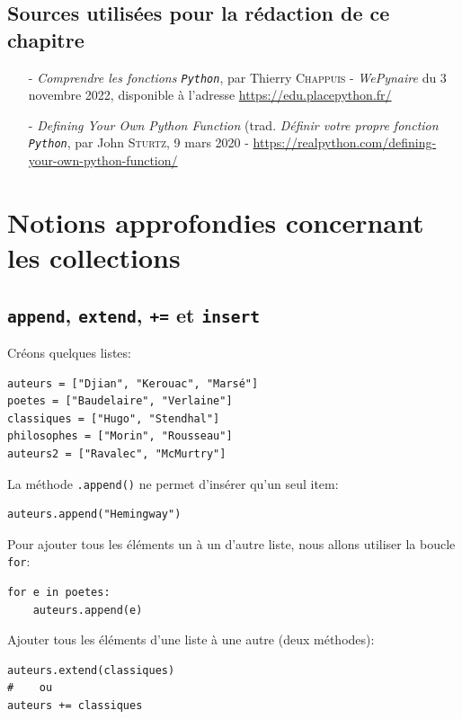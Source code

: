 \documentclass[a4paper,12pt]{book}
\begin{document}
\section*{Sources utilisées pour la rédaction de ce chapitre}
\begin{itemize}
	\item[-] \textit{Comprendre les fonctions \texttt{Python}}, par Thierry \textsc{Chappuis} - \textit{WePynaire} du 3 novembre 2022, disponible à l'adresse \url{https://edu.placepython.fr/}
	\item[-] \textit{Defining Your Own Python Function} (trad. \og \textit{Définir votre propre fonction \texttt{Python}\fg{}}, par  John \textsc{Sturtz}, 9 mars 2020 - \url{https://realpython.com/defining-your-own-python-function/}
\end{itemize}
\medskip

\chapter{Notions approfondies concernant les collections}
\section{\texttt{append}, \texttt{extend}, \texttt{+=} et \texttt{insert}}
Créons quelques listes:
\begin{lstlisting}
auteurs = ["Djian", "Kerouac", "Marsé"]
poetes = ["Baudelaire", "Verlaine"]
classiques = ["Hugo", "Stendhal"]
philosophes = ["Morin", "Rousseau"]
auteurs2 = ["Ravalec", "McMurtry"]
\end{lstlisting}
\medskip

La méthode \texttt{.append()} ne permet d'insérer qu'un seul item:
\begin{lstlisting}
auteurs.append("Hemingway")
\end{lstlisting}
\medskip

Pour ajouter tous les éléments un à un d'autre liste, nous allons utiliser la boucle \texttt{for}:
\begin{lstlisting}
for e in poetes:
    auteurs.append(e)
\end{lstlisting}
\medskip

Ajouter tous les éléments d'une liste à une autre (deux méthodes):
\begin{lstlisting}
auteurs.extend(classiques)
#    ou
auteurs += classiques
\end{lstlisting}
\medskip
\end{document}
